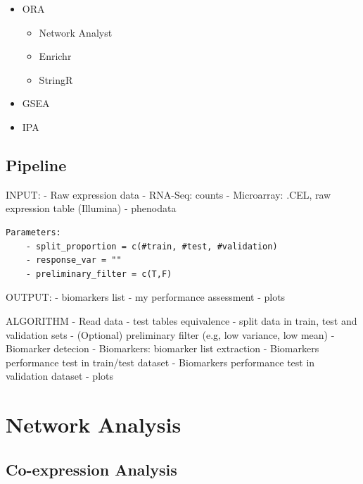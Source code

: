 \documentclass[
]{book}
\begin{document}
\begin{itemize}
\item
  ORA

  \begin{itemize}
  \item
    Network Analyst
  \item
    Enrichr
  \item
    StringR
  \end{itemize}
\item
  GSEA
\item
  IPA
\end{itemize}

\hypertarget{pipeline}{%
\subsection{Pipeline}\label{pipeline}}

INPUT: - Raw expression data - RNA-Seq: counts - Microarray: .CEL, raw expression table (Illumina) - phenodata

\begin{verbatim}
Parameters:
    - split_proportion = c(#train, #test, #validation)
    - response_var = ""
    - preliminary_filter = c(T,F)
\end{verbatim}

OUTPUT: - biomarkers list - my performance assessment - plots

ALGORITHM - Read data - test tables equivalence - split data in train, test and validation sets - (Optional) preliminary filter (e.g, low variance, low mean) - Biomarker detecion - Biomarkers: biomarker list extraction - Biomarkers performance test in train/test dataset - Biomarkers performance test in validation dataset - plots

\hypertarget{section-1}{%
\subsection{}\label{section-1}}

\hypertarget{network-analysis}{%
\section{Network Analysis}\label{network-analysis}}

\hypertarget{co-expression-analysis}{%
\subsection{Co-expression Analysis}\label{co-expression-analysis}}
\end{document}
